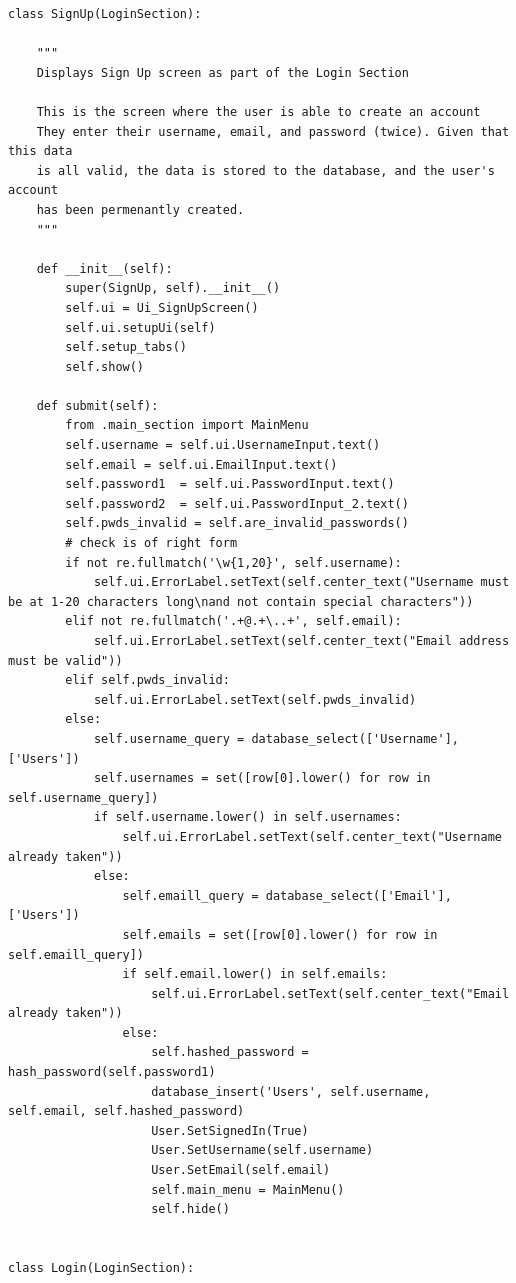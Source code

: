 \documentclass{article}
\begin{document}
\begin{lstlisting}
class SignUp(LoginSection):

    """
    Displays Sign Up screen as part of the Login Section

    This is the screen where the user is able to create an account
    They enter their username, email, and password (twice). Given that this data
    is all valid, the data is stored to the database, and the user's account
    has been permenantly created.
    """

    def __init__(self):
        super(SignUp, self).__init__()
        self.ui = Ui_SignUpScreen()
        self.ui.setupUi(self)
        self.setup_tabs()
        self.show()

    def submit(self):
        from .main_section import MainMenu
        self.username = self.ui.UsernameInput.text()
        self.email = self.ui.EmailInput.text()
        self.password1  = self.ui.PasswordInput.text()
        self.password2  = self.ui.PasswordInput_2.text()
        self.pwds_invalid = self.are_invalid_passwords()
        # check is of right form
        if not re.fullmatch('\w{1,20}', self.username):
            self.ui.ErrorLabel.setText(self.center_text("Username must be at 1-20 characters long\nand not contain special characters"))
        elif not re.fullmatch('.+@.+\..+', self.email):
            self.ui.ErrorLabel.setText(self.center_text("Email address must be valid"))
        elif self.pwds_invalid:
            self.ui.ErrorLabel.setText(self.pwds_invalid)
        else:
            self.username_query = database_select(['Username'], ['Users'])
            self.usernames = set([row[0].lower() for row in self.username_query])
            if self.username.lower() in self.usernames:
                self.ui.ErrorLabel.setText(self.center_text("Username already taken"))
            else:
                self.emaill_query = database_select(['Email'], ['Users'])
                self.emails = set([row[0].lower() for row in self.emaill_query])
                if self.email.lower() in self.emails:
                    self.ui.ErrorLabel.setText(self.center_text("Email already taken"))
                else:
                    self.hashed_password = hash_password(self.password1)
                    database_insert('Users', self.username, self.email, self.hashed_password)
                    User.SetSignedIn(True)
                    User.SetUsername(self.username)
                    User.SetEmail(self.email)
                    self.main_menu = MainMenu()
                    self.hide()


class Login(LoginSection):


\end{lstlisting}
\end{document}
